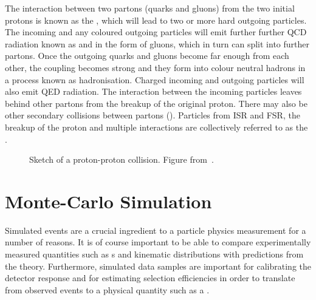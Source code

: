 The interaction between two  partons (quarks and gluons) from the two initial
protons is known as the , which will lead to two or more
hard outgoing particles. The incoming and any coloured outgoing particles will
emit further further QCD radiation known as 
and  in the form of gluons, which in turn can
split into further partons. Once the outgoing quarks and gluons become far enough from
each other, the coupling becomes strong and they form into colour neutral
hadrons in a process known as hadronisation. Charged incoming and outgoing
particles will also emit QED radiation. The interaction between the incoming
particles leaves behind other partons from the breakup of the original proton.
There may also be other secondary collisions between partons (). Particles from ISR and FSR, the breakup of the proton and
multiple interactions are collectively referred to as the .

\begin{figure}
\centering
        \vspace{-5mm}
    \caption{\small
Sketch of a proton-proton collision. Figure from~\cite{Campbell:2006wx}.
}
    \label{fig:pp-event}
\end{figure}

\section{Monte-Carlo Simulation}
\label{sec:Theory-MC}

Simulated events are a crucial ingredient to a particle physics
measurement for a number of reasons. It is of course important to be able to
compare experimentally measured quantities such as \cx s and kinematic
distributions with predictions from the theory. Furthermore, simulated data
samples are important for calibrating the detector response and for estimating
selection efficiencies in order to translate from observed events
to a physical quantity such as a \cx. 

